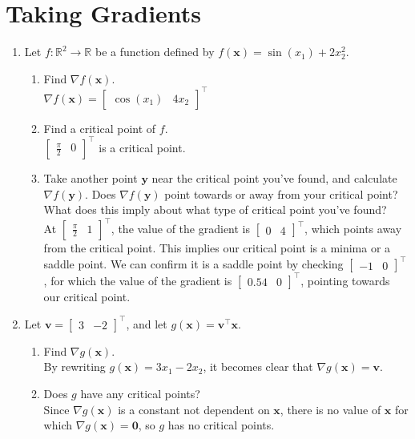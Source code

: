 \documentclass{article}
\begin{document}
\section{Taking Gradients}
\begin{enumerate}[label=\arabic*.]
\item Let $f: \mathbb{R}^2 \rightarrow \mathbb{R}$ be a function defined by $f(\mathbf{x}) = \sin(x_1) + 2x_2^2$.
	\begin{enumerate}[label=(\alph*)]
	\item Find $\nabla f(\mathbf{x})$.\\
		{\color{blue}$\nabla f(\mathbf{x}) = \begin{bmatrix} \cos(x_1) & 4x_2 \end{bmatrix}^\top$}
	\item Find a critical point of $f$.\\
		{\color{blue}$\begin{bmatrix} \frac{\pi}{2} & 0 \end{bmatrix}^\top$ is a critical point.}
	\item Take another point $\mathbf{y}$ near the critical point you've found, and calculate $\nabla f(\mathbf{y})$. Does $\nabla f(\mathbf{y})$ point towards or away from your critical point? What does this imply about what type of critical point you've found?\\
		{\color{blue}At $\begin{bmatrix} \frac{\pi}{2} &  1 \end{bmatrix}^\top$, the value of the gradient is $\begin{bmatrix} 0 & 4 \end{bmatrix}^\top$, which points away from the critical point. This implies our critical point is a minima or a saddle point. We can confirm it is a saddle point by checking $\begin{bmatrix} -1 & 0 \end{bmatrix}^\top$, for which the value of the gradient is $\begin{bmatrix} 0.54 & 0 \end{bmatrix}^\top$, pointing towards our critical point.}
	\end{enumerate}
\item Let $\mathbf{v} = \begin{bmatrix} 3 & -2 \end{bmatrix}^\top$, and let $g(\mathbf{x}) = \mathbf{v^\top x}$.
	\begin{enumerate}[label=(\alph*)]
	\item Find $\nabla g(\mathbf{x})$.\\
		{\color{blue}By rewriting $g(\mathbf{x}) = 3x_1 - 2x_2$, it becomes clear that $\nabla g(\mathbf{x}) = \mathbf{v}$.}
	\item Does $g$ have any critical points?\\
		{\color{blue}Since $\nabla g(\mathbf{x})$ is a constant not dependent on $\mathbf{x}$, there is no value of $\mathbf{x}$ for which $\nabla g(\mathbf{x}) = \mathbf{0}$, so $g$ has no critical points.}
	\end{enumerate}
\end{enumerate}
\end{document}
